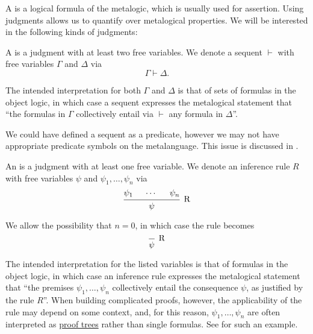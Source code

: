 \begin{definition}\label{def:judgment}\mimprovised
  A  is a logical formula of the metalogic, which is usually used for assertion. Using judgments allows us to quantify over metalogical properties. We will be interested in the following kinds of judgments:

  \begin{thmenum}
     A  is a judgment with at least two free variables. We denote a sequent \( \vdash \) with free variables \( \Gamma \) and \( \Delta \) via
    \begin{equation*}
      \Gamma \vdash \Delta.
    \end{equation*}

    The intended interpretation for both \( \Gamma \) and \( \Delta \) is that of sets of formulas in the object logic, in which case a sequent expresses the metalogical statement that \enquote{the formulas in \( \Gamma \) collectively entail via \( \vdash \) any formula in \( \Delta \)}.

    We could have defined a sequent as a predicate, however we may not have appropriate predicate symbols on the metalanguage. This issue is discussed in .

     An  is a judgment with at least one free variable. We denote an inference rule \( R \) with free variables \( \psi \) and \( \psi_1, \ldots, \psi_n \) via
    \begin{equation*}
      \begin{prooftree}
        \hypo{ \psi_1 }
        \hypo{ \cdots }
        \hypo{ \psi_n }
        \infer3[R]{ \psi }
      \end{prooftree}
    \end{equation*}

    We allow the possibility that \( n = 0 \), in which case the rule becomes
    \begin{equation*}
      \begin{prooftree}
        \infer0[R]{ \psi }
      \end{prooftree}
    \end{equation*}

    The intended interpretation for the listed variables is that of formulas in the object logic, in which case an inference rule expresses the metalogical statement that \enquote{the premises \( \psi_1, \ldots, \psi_n \) collectively entail the consequence \( \psi \), as justified by the rule \( R \)}. When building complicated proofs, however, the applicability of the rule may depend on some context, and, for this reason, \( \psi_1, \ldots, \psi_n \) are often interpreted as \hyperref[def:proof_tree]{proof trees} rather than single formulas. See  for such an example.
  \end{thmenum}
\end{definition}

